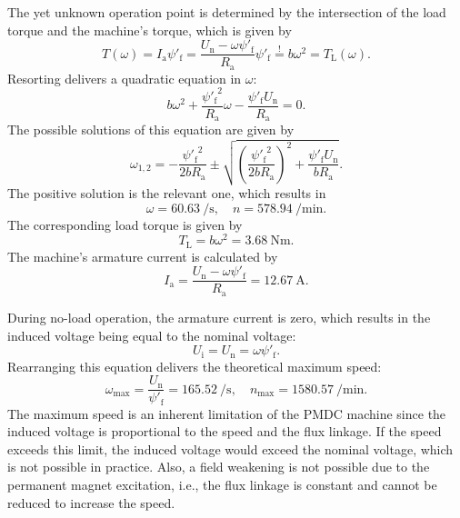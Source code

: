 \begin{solutionblock}
    The yet unknown operation point is determined by the intersection of the load torque and the machine's torque, which is given by
    $$
        T(\omega) = I_\mathrm{a} \psi'_\mathrm{f} = \frac{U_\mathrm{n} - \omega \psi'_\mathrm{f}}{R_\mathrm{a}} \psi'_\mathrm{f}\stackrel{!}{=} b \omega^2 = T_\mathrm{L}(\omega).
    $$
    Resorting delivers a quadratic equation in $\omega$:
    $$
        b \omega^2 + \frac{{\psi'_\mathrm{f}}^2}{R_\mathrm{a}}\omega - \frac{\psi'_\mathrm{f}U_\mathrm{n}}{R_\mathrm{a}} = 0.
    $$
    The possible solutions of this equation are given by
    $$
        \omega_{1,2} = -\frac{{\psi'_\mathrm{f}}^2}{2bR_\mathrm{a}} \pm \sqrt{\left(\frac{{\psi'_\mathrm{f}}^2}{2bR_\mathrm{a}}\right)^2 + \frac{\psi'_\mathrm{f}U_\mathrm{n}}{bR_\mathrm{a}}}.
    $$
    The positive solution is the relevant one, which results in
    $$
        \omega = \SI{60.63}{\per\second}, \quad n= \SI{578.94}{\per\minute}.
    $$
    The corresponding load torque is given by
    $$
        T_\mathrm{L} = b \omega^2 = \SI{3.68}{\newton\meter}.
    $$
    The machine's armature current is calculated by
    $$
        I_\mathrm{a} = \frac{U_\mathrm{n} - \omega \psi'_\mathrm{f}}{R_\mathrm{a}} = \SI{12.67}{\ampere}.
    $$
\end{solutionblock}


\begin{solutionblock}
    During no-load operation, the armature current is zero, which results in the induced voltage being equal to the nominal voltage:
    $$
        U_\mathrm{i} = U_\mathrm{n} = \omega \psi'_\mathrm{f}.
    $$
    Rearranging this equation delivers the theoretical maximum speed:
    $$
        \omega_\mathrm{max} = \frac{U_\mathrm{n}}{\psi'_\mathrm{f}} = \SI{165.52}{\per\second}, \quad n_\mathrm{max} = \SI{1580.57}{\per\minute}.
    $$
    The maximum speed is an inherent limitation of the PMDC machine since the induced voltage is proportional to the speed and the flux linkage. If the speed exceeds this limit, the induced voltage would exceed the nominal voltage, which is not possible in practice. Also, a field weakening is not possible due to the permanent magnet excitation, i.e., the flux linkage is constant and cannot be reduced to increase the speed.
\end{solutionblock}